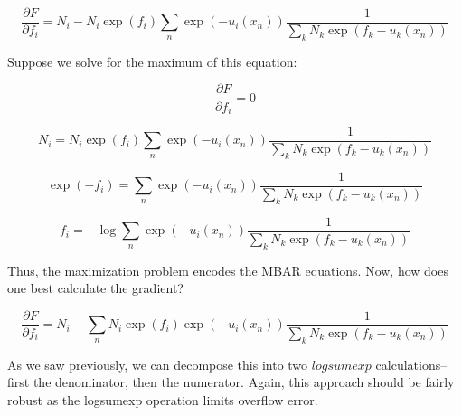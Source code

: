 \documentclass[12pt]{article}
\begin{document}
$$\frac{\partial F}{\partial f_i} = N_i - N_i \exp(f_i) \sum_n \exp(-u_i(x_n)) \frac{1}{\sum_k N_k \exp(f_k - u_k(x_n))}$$

Suppose we solve for the maximum of this equation:

$$\frac{\partial F}{\partial f_i} = 0$$

$$N_i = N_i \exp(f_i) \sum_n \exp(-u_i(x_n)) \frac{1}{\sum_k N_k \exp(f_k - u_k(x_n))}$$

$$\exp(-f_i) = \sum_n \exp(-u_i(x_n)) \frac{1}{\sum_k N_k \exp(f_k - u_k(x_n))}$$

$$f_i = -\log \sum_n \exp(-u_i(x_n)) \frac{1}{\sum_k N_k \exp(f_k - u_k(x_n))}$$

Thus, the maximization problem encodes the MBAR equations.  Now, how does one best calculate the gradient?

$$\frac{\partial F}{\partial f_i} = N_i - \sum_n N_i \exp(f_i) \exp(-u_i(x_n)) \frac{1}{\sum_k N_k \exp(f_k - u_k(x_n))}$$

As we saw previously, we can decompose this into two $logsumexp$ calculations--first the denominator, then the numerator.  Again, this approach should be fairly robust as the logsumexp operation limits overflow error.
\end{document}
